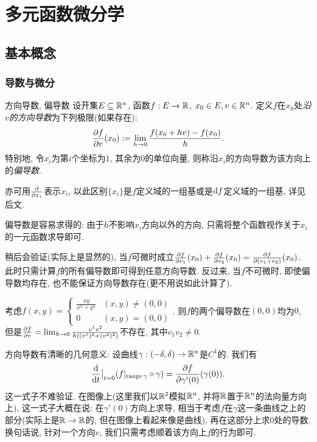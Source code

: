 \chapter{多元函数微分学}

\section{基本概念}

\subsection{导数与微分}

\begin{definition}{方向导数, 偏导数}
    设开集$E \subseteq \mathbb{R} ^n$, 函数$f:E \to \mathbb{R}$, $x_0 \in E , v \in \mathbb{R} ^n$. 定义$f$在$x_0$处\textit{沿$v$的方向导数}为下列极限(如果存在): $$\frac{\partial f}{\partial v}(x_0) := \lim_{h \to 0} \frac{f(x_0+hv)-f(x_0)}{h}.$$
    特别地, 令$x_i$为第$i$个坐标为$1$, 其余为$0$的单位向量, 则称沿$x_i$的方向导数为该方向上的\textit{偏导数}. 
\end{definition}
\begin{remark}
	亦可用$\frac{\partial}{\partial x_i}$表示$x_i$, 以此区别$\{ x_i \}$是$f$定义域的一组基或是$\mathop{}\!\mathrm{d} f$定义域的一组基, 详见后文. 
\end{remark}

偏导数是容易求得的: 由于$h$不影响$x_i$方向以外的方向, 只需将整个函数视作关于$x_i$的一元函数求导即可. 

稍后会验证(实际上是显然的), 当$f$可微时成立$\frac{\partial f}{\partial v_1}(x_0) + \frac{\partial f}{\partial v_2}(x_0) = \frac{\partial f}{\partial (v_1+v_2)}(x_0)$. 此时只需计算$f$的所有偏导数即可得到任意方向导数. 反过来, 当$f$不可微时, 即使偏导数均存在, 也不能保证方向导数存在(更不用说如此计算了). 

\begin{example}
	考虑$f(x,y)=\begin{cases}
		\frac{xy}{x^2+y^2} & (x,y) \neq (0,0) \\ 0 & (x,y)=(0,0)
	\end{cases}$. 则$f$的两个偏导数在$(0,0)$均为$0$, 但是$\frac{\partial f}{\partial v} = \lim_{h \to 0} \frac{v^1v^2}{h((v^1)^2+(v^2)^2)}$不存在, 其中$v_1v_2 \neq 0$. 
\end{example}

方向导数有清晰的几何意义: 设曲线$\gamma :(-\delta,\delta) \to \mathbb{R} ^n$是$C^1$的. 我们有$$\frac{\mathop{}\!\mathrm{d}}{\mathop{}\!\mathrm{d} t} \big|_{t=0} (f|_{\operatorname{range} \gamma} \circ \gamma) = \frac{\partial f}{\partial \gamma '(0)} (\gamma (0)). $$
这一式子不难验证. 在图像上(这里我们以$\mathbb{R} ^2$模拟$\mathbb{R} ^n$, 并将$\mathbb{R}$置于$\mathbb{R} ^n$的法向量方向上), 这一式子大概在说: 在$\gamma '(0)$方向上求导, 相当于考虑$f$在$\gamma$这一条曲线之上的部分(实际上是$\mathbb{R} \to \mathbb{R}$的, 但在图像上看起来像是曲线), 再在这部分上求$0$处的导数. 换句话说, 针对一个方向$v$, 我们只需考虑顺着该方向上$f$的行为即可. 

